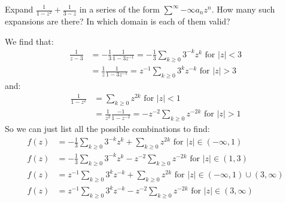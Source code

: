 \documentclass[12pt]{article}
\begin{document}
\begin{statement}[2]
  Expand $\frac{1}{1-z^2} + \frac{1}{3-z}$ in a series of the form $\sum^{\infty}{-\infty} a_nz^n$. How many 
  such expansions are there? In which domain is each of them valid?
\end{statement}
\begin{newproof}
  We find that:
  \begin{align*}
    \frac{1}{z-3} &= -\frac{1}{3} \frac{1}{1-3z^{-1}}=-\frac{1}{3} \sum_{ k \geq 0} 3^{-k}z^{k} \text{ for } \vert z \vert < 3 \\
                  &= \frac{1}{z} \frac{1}{1-3z^{-1}} = z^{-1}\sum_{k \geq 0} 3^kz^{-k} \text{ for } \vert z \vert > 3 
  \end{align*}
  and:
  \begin{align*}
    \frac{1}{1-z^2} &= \sum_{k \geq 0} z^{2k} \text{ for } \vert z \vert < 1 \\
                    &= \frac{1}{z^2} \frac{-1}{1-z^{-2}}=-z^{-2}\sum_{k \geq 0} z^{-2k} \text{ for } \vert z \vert > 1 
  \end{align*}
  So we can just list all the possible combinations to find:
  \begin{align*}
    f(z) &= -\frac{1}{3} \sum_{ k \geq 0} 3^{-k}z^{k} + \sum_{k \geq 0} z^{2k} \text{ for } \vert z \vert \in (-\infty, 1) \\
    f(z) &= -\frac{1}{3} \sum_{ k \geq 0} 3^{-k}z^{k}-z^{-2}\sum_{k \geq 0} z^{-2k} \text{ for } \vert z \vert \in (1,3) \\
    f(z) &= z^{-1}\sum_{k \geq 0} 3^kz^{-k} + \sum_{k \geq 0} z^{2k} \text{ for } \vert z \vert \in (-\infty,1) \cup (3, \infty) \\
    f(z) &= z^{-1}\sum_{k \geq 0} 3^kz^{-k}-z^{-2}\sum_{k \geq 0} z^{-2k} \text{ for } \vert z \vert \in (3,\infty)
  \end{align*}
\end{newproof}

\end{document}
